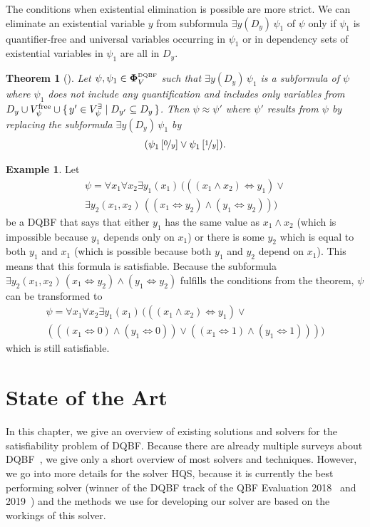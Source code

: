 \documentclass[
  digital, %
  color,
  twoside, %
  table,   %
  nolof,     %
  nolot,     %
]{fithesis3}
\let\setbuilder\set
\newcommand{\simpleset}[1]{\{{#1}\}}
\renewcommand{\set}[1]{\normalexpandarg\IfSubStr{#1}{|}{\setbuilder{#1}}{\simpleset{#1}}}
\newtheorem{theorem}{Theorem}[chapter] %
\theoremstyle{definition}
\newtheorem{example}{Example}
\theoremstyle{remark}
\newcommand{\substitute}[2]{\left[ \nicefrac{#2}{#1} \right]}
\newcommand{\DQBF}[1]{\mathbf{\Phi}_{#1}^{\normalfont{\text{\tiny DQBF}}}}
\newcommand{\evars}[1]{V_{#1}^{\exists}}
\newcommand{\fvars}[1]{V_{#1}^{\mathrm{free}}}
\newcommand{\lequal}{\Leftrightarrow}
\newcommand{\itholds}{\,}
\begin{document}
The conditions when existential elimination is possible are more strict. We can eliminate an existential variable $y$ from subformula $\exists y (D_y) \itholds \psi_1$ of $\psi$ only if $\psi_1$ is quantifier-free and universal variables occurring in $\psi_1$ or in dependency sets of existential variables in $\psi_1$ are all in $D_y$.

\begin{theorem}[{\cite[Theorem 5]{HQSquantifierLocalisation}}]
\label{thrm:exElim}
  Let $\psi, \psi_1 \in \DQBF{V}$ such that $\exists y(D_y)\itholds\psi_1$ is a subformula of $\psi$ where $\psi_1$ does not include any quantification and includes only variables from $D_y \cup \fvars{\psi} \cup \set{y' \in \evars{\psi} | D_{y'} \subseteq D_y}$. Then $\psi \approx \psi'$ where $\psi'$ results from $\psi$ by replacing the subformula $\exists y(D_y)\itholds\psi_1$ by
  \[(\psi_1\substitute{y}{0} \lor \psi_1\substitute{y}{1}).\]
\end{theorem}
\begin{example}
Let
\begin{multline*}
\psi = \forall x_1 \forall x_2 \exists y_1(x_1) \itholds (((x_1 \land x_2) \lequal y_1) \lor {} \\
\exists y_2 (x_1,x_2) \itholds ((x_1 \lequal y_2) \land (y_1 \lequal y_2)))
\end{multline*}
be a DQBF that says that either $y_1$ has the same value as $x_1 \land x_2$ (which is impossible because $y_1$ depends only on $x_1$) or there is some $y_2$ which is equal to both $y_1$ and $x_1$ (which is possible because both $y_1$ and $y_2$ depend on $x_1$). This means that this formula is satisfiable. Because the subformula $\exists y_2 (x_1,x_2) \itholds (x_1 \lequal y_2) \land (y_1 \lequal y_2)$ fulfills the conditions from the theorem, $\psi$ can be transformed to
\begin{multline*}
\psi = \forall x_1 \forall x_2 \exists y_1(x_1) \itholds (((x_1 \land x_2) \lequal y_1) \lor {}\\
(((x_1 \lequal 0) \land (y_1 \lequal 0)) \lor ((x_1 \lequal 1) \land (y_1 \lequal 1))))
\end{multline*}
which is still satisfiable.
\end{example}



\chapter{State of the Art}
\label{chap:SoA}
In this chapter, we give an overview of existing solutions and solvers for the satisfiability problem of DQBF. Because there are already multiple surveys about DQBF~\cite{DQBFStateOfArtTalk,DQBFStateOfArt,DQBFStateOfArtNew}, we give only a short overview of most solvers and techniques. However, we go into more details for the solver HQS, because it is currently the best performing solver (winner of the DQBF track of the QBF Evaluation 2018~\cite{QBFeval18} and 2019~\cite{QBFeval19}) and the methods we use for developing our solver are based on the workings of this solver.
\end{document}
